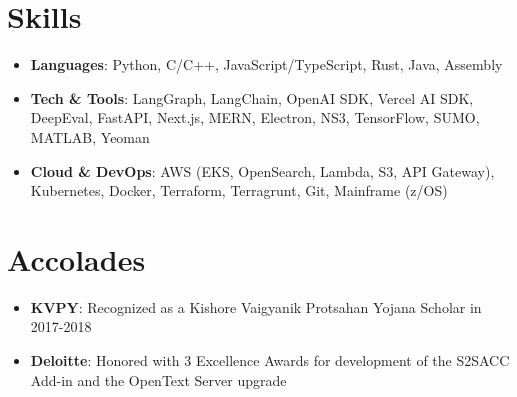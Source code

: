 \documentclass[letterpaper,10pt]{article}
\newcommand{\resumeItem}[2]{
  \item\small{
    \textbf{#1}{: #2 \vspace{-2pt}}
  }
}
\newcommand{\resumeSubItem}[2]{\resumeItem{#1}{#2}\vspace{-3pt}}
\newcommand{\resumeSubHeadingListStart}{\begin{itemize}[leftmargin=*]}
\newcommand{\resumeSubHeadingListEnd}{\end{itemize}}
\begin{document}
\section{Skills}
    \resumeSubHeadingListStart
        \resumeSubItem
            {Languages} {Python, C/C++, JavaScript/TypeScript, Rust, Java, Assembly}
        \resumeSubItem
            {Tech \& Tools} {LangGraph, LangChain, OpenAI SDK, Vercel AI SDK, DeepEval, FastAPI, Next.js, MERN, Electron, NS3, TensorFlow, SUMO, MATLAB, Yeoman}
        \resumeSubItem
            {Cloud \& DevOps}{AWS (EKS, OpenSearch, Lambda, S3, API Gateway), Kubernetes, Docker, Terraform, Terragrunt, Git, Mainframe (z/OS)}
 \resumeSubHeadingListEnd

 \section{Accolades}
  \resumeSubHeadingListStart
      \resumeSubItem{KVPY}
      {Recognized as a Kishore Vaigyanik Protsahan Yojana Scholar in 2017-2018}
    \resumeSubItem{Deloitte}
      {Honored with 3 Excellence Awards for development of the S2SACC Add-in and the OpenText Server upgrade}
  \resumeSubHeadingListEnd
\end{document}
